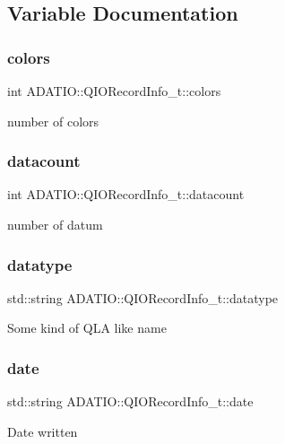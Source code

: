 \subsection{Variable Documentation}
\mbox{\label{group__qio_gad7bee26b17d771036f2b87c847328b24}} 
\subsubsection{\texorpdfstring{colors}{colors}}
{\footnotesize\ttfamily int A\+D\+A\+T\+I\+O\+::\+Q\+I\+O\+Record\+Info\+\_\+t\+::colors}

number of colors \mbox{\label{group__qio_ga8051a480bb96231cfa758ddfab5ed415}} 
\subsubsection{\texorpdfstring{datacount}{datacount}}
{\footnotesize\ttfamily int A\+D\+A\+T\+I\+O\+::\+Q\+I\+O\+Record\+Info\+\_\+t\+::datacount}

number of datum \mbox{\label{group__qio_ga62e8335fcf5ac25dc36eaeee8519ee64}} 
\subsubsection{\texorpdfstring{datatype}{datatype}}
{\footnotesize\ttfamily std\+::string A\+D\+A\+T\+I\+O\+::\+Q\+I\+O\+Record\+Info\+\_\+t\+::datatype}

Some kind of Q\+LA like name \mbox{\label{group__qio_ga1894a21fc67312581fac55295c8941e6}} 
\subsubsection{\texorpdfstring{date}{date}}
{\footnotesize\ttfamily std\+::string A\+D\+A\+T\+I\+O\+::\+Q\+I\+O\+Record\+Info\+\_\+t\+::date}

Date written \mbox{\label{group__qio_ga29f30bb416493194287e2a1314e99c86}} 
